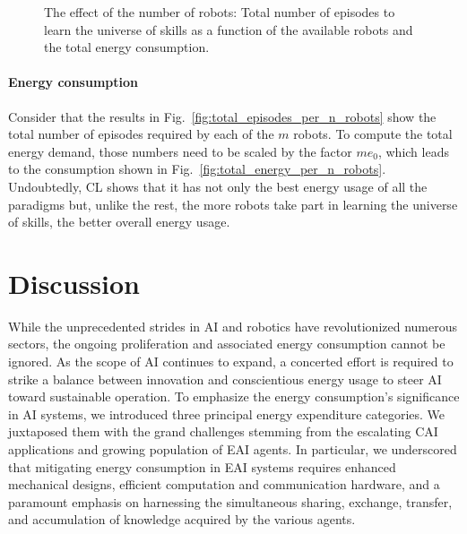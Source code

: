 \documentclass[12pt]{article}
\begin{document}
\begin{figure}[!h]
\begin{subfigure}[t]{0.45\textwidth}
	\end{subfigure}
	\hspace*{\fill}
	\caption[] {\label{fig:final_results} The effect of the number of robots:  Total number of episodes to learn the universe of skills as a function of the available robots and  the total energy consumption.}
\end{figure}

\paragraph*{Energy consumption}
Consider that the results in Fig.~\ref{fig:total_episodes_per_n_robots} show the total number of episodes required by each of the $m$ robots. To compute the total energy demand, those numbers need to be scaled by the factor $m e_0$, which leads to the consumption shown in Fig.~\ref{fig:total_energy_per_n_robots}. Undoubtedly, CL shows that it has not only the best energy usage of all the paradigms but, unlike the rest, the more robots take part in learning the universe of skills, the better overall energy usage.

\section*{Discussion}\label{sec:discussion}
While the unprecedented strides in AI and robotics have revolutionized numerous sectors, the ongoing proliferation and associated energy consumption cannot be ignored. As the scope of AI continues to expand, a concerted effort is required to strike a balance between innovation and conscientious energy usage to steer AI toward sustainable operation. To emphasize the energy consumption's significance in AI systems, we introduced three principal energy expenditure categories. We juxtaposed them with the grand challenges stemming from the escalating CAI applications and growing population of EAI agents. In particular, we underscored that mitigating energy consumption in EAI systems requires enhanced mechanical designs, efficient computation and communication hardware, and a paramount emphasis on harnessing the simultaneous sharing, exchange, transfer, and accumulation of knowledge acquired by the various agents.
\end{document}
